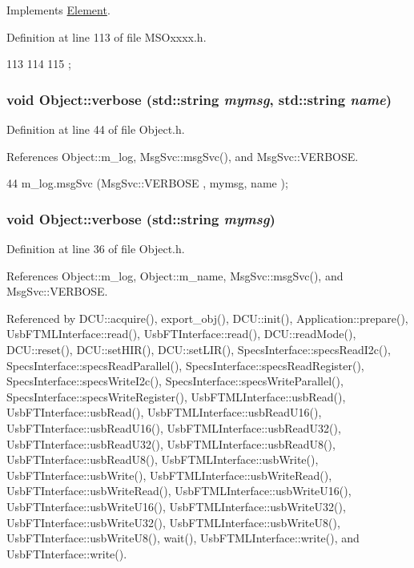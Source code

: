 Implements \hyperlink{classElement_a4e6c83efae95616ebddd03c793a26661}{Element}.

Definition at line 113 of file MSOxxxx.h.


\begin{DoxyCode}
113                  {
114     
115   };
\end{DoxyCode}
\hypertarget{classObject_a2d4120195317e2a3c6532e8bb9f3da68}{
\subsubsection[{verbose}]{\setlength{\rightskip}{0pt plus 5cm}void Object::verbose (std::string {\em mymsg}, \/  std::string {\em name})}}
\label{classObject_a2d4120195317e2a3c6532e8bb9f3da68}


Definition at line 44 of file Object.h.

References Object::m\_\-log, MsgSvc::msgSvc(), and MsgSvc::VERBOSE.


\begin{DoxyCode}
44 { m_log.msgSvc (MsgSvc::VERBOSE , mymsg, name ); }
\end{DoxyCode}
\hypertarget{classObject_a83d2db2df682907ea1115ad721c1c4a1}{
\subsubsection[{verbose}]{\setlength{\rightskip}{0pt plus 5cm}void Object::verbose (std::string {\em mymsg})}}
\label{classObject_a83d2db2df682907ea1115ad721c1c4a1}


Definition at line 36 of file Object.h.

References Object::m\_\-log, Object::m\_\-name, MsgSvc::msgSvc(), and MsgSvc::VERBOSE.

Referenced by DCU::acquire(), export\_\-obj(), DCU::init(), Application::prepare(), UsbFTMLInterface::read(), UsbFTInterface::read(), DCU::readMode(), DCU::reset(), DCU::setHIR(), DCU::setLIR(), SpecsInterface::specsReadI2c(), SpecsInterface::specsReadParallel(), SpecsInterface::specsReadRegister(), SpecsInterface::specsWriteI2c(), SpecsInterface::specsWriteParallel(), SpecsInterface::specsWriteRegister(), UsbFTMLInterface::usbRead(), UsbFTInterface::usbRead(), UsbFTMLInterface::usbReadU16(), UsbFTInterface::usbReadU16(), UsbFTMLInterface::usbReadU32(), UsbFTInterface::usbReadU32(), UsbFTMLInterface::usbReadU8(), UsbFTInterface::usbReadU8(), UsbFTMLInterface::usbWrite(), UsbFTInterface::usbWrite(), UsbFTMLInterface::usbWriteRead(), UsbFTInterface::usbWriteRead(), UsbFTMLInterface::usbWriteU16(), UsbFTInterface::usbWriteU16(), UsbFTMLInterface::usbWriteU32(), UsbFTInterface::usbWriteU32(), UsbFTMLInterface::usbWriteU8(), UsbFTInterface::usbWriteU8(), wait(), UsbFTMLInterface::write(), and UsbFTInterface::write().


